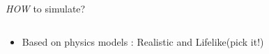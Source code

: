 \documentclass[handout,t]{beamer}
\begin{document}
\begin{frame}[t]{\emph{HOW} to simulate?}
\begin{columns}
\begin{column}
\begin{itemize}
        \item Based on physics models : Realistic and Lifelike(pick it!\checkmark)
        \begin{figure}[thpb]
          \centering
        \label{fig:system}
        \end{figure}
      \end{itemize}
    \end{column}%
  \end{columns}
\end{frame}
\end{document}
